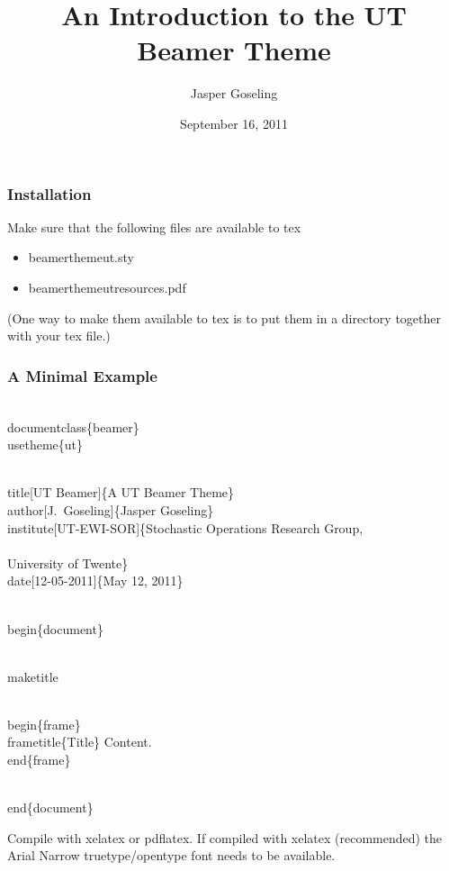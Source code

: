 \documentclass{beamer}
\title[UT Beamer]{An Introduction to the UT\\ Beamer Theme}
\author[J.~Goseling]{Jasper Goseling } %
\institute[UT-EWI-SOR]{Stochastic Operations Research Group,\\ University of Twente}
\date[16-09-2011]{September 16, 2011}
\begin{document}
\maketitle


\begin{frame} \frametitle{Installation}
Make sure that the following files are available to tex
\begin{itemize}
\item beamerthemeut.sty
\item beamerthemeutresources.pdf
\end{itemize}
(One way to make them available to tex is to put them in a directory together with your tex file.)
\end{frame}



\begin{frame}[fragile] \frametitle{A Minimal Example}
{\tiny
\begin{semiverbatim}
\\documentclass\{beamer\}
\\usetheme\{ut\}

\\title[UT Beamer]\{A UT Beamer Theme\}
\\author[J.~Goseling]\{Jasper Goseling\}
\\institute[UT-EWI-SOR]\{Stochastic Operations Research
  Group,\\\\ University of Twente\}
\\date[12-05-2011]\{May 12, 2011\}

\\begin\{document\}

\\maketitle

\\begin\{frame\}\\frametitle\{Title\}
Content.
\\end\{frame\}

\\end\{document\}
\end{semiverbatim}
}

Compile with xelatex or pdflatex. If compiled with xelatex (recommended) the Arial Narrow truetype/opentype font needs to be available.
\end{frame}
\end{document}
